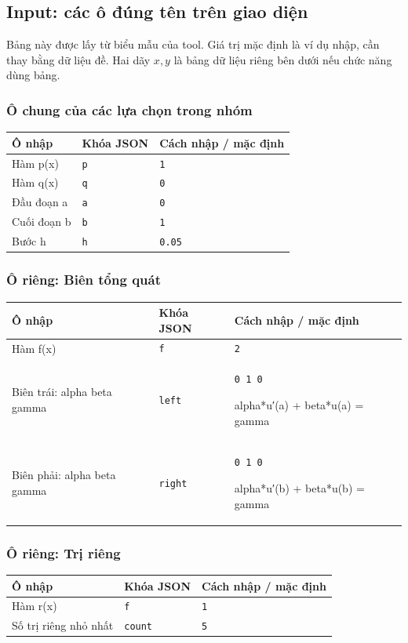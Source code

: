 \subsection*{Input: các ô đúng tên trên giao diện}
Bảng này được lấy từ biểu mẫu của tool. Giá trị mặc định là ví dụ nhập, cần thay bằng dữ liệu đề. Hai dãy $x,y$ là bảng dữ liệu riêng bên dưới nếu chức năng dùng bảng.
\subsubsection*{Ô chung của các lựa chọn trong nhóm}
\begin{center}\small\begin{tabular}{@{}p{.32\linewidth}p{.17\linewidth}p{.43\linewidth}@{}}\toprule
Ô nhập & Khóa JSON & Cách nhập / mặc định\\\midrule
Hàm p(x) & \texttt{p} & \texttt{1}\\[3pt]
Hàm q(x) & \texttt{q} & \texttt{0}\\[3pt]
Đầu đoạn a & \texttt{a} & \texttt{0}\\[3pt]
Cuối đoạn b & \texttt{b} & \texttt{1}\\[3pt]
Bước h & \texttt{h} & \texttt{0.05}\\[3pt]
\bottomrule\end{tabular}\end{center}
\subsubsection*{Ô riêng: Biên tổng quát}
\begin{center}\small\begin{tabular}{@{}p{.32\linewidth}p{.17\linewidth}p{.43\linewidth}@{}}\toprule
Ô nhập & Khóa JSON & Cách nhập / mặc định\\\midrule
Hàm f(x) & \texttt{f} & \texttt{2}\\[3pt]
Biên trái: alpha beta gamma & \texttt{left} & \texttt{0 1 0}
\par alpha*u′(a) + beta*u(a) = gamma\\[3pt]
Biên phải: alpha beta gamma & \texttt{right} & \texttt{0 1 0}
\par alpha*u′(b) + beta*u(b) = gamma\\[3pt]
\bottomrule\end{tabular}\end{center}
\subsubsection*{Ô riêng: Trị riêng}
\begin{center}\small\begin{tabular}{@{}p{.32\linewidth}p{.17\linewidth}p{.43\linewidth}@{}}\toprule
Ô nhập & Khóa JSON & Cách nhập / mặc định\\\midrule
Hàm r(x) & \texttt{f} & \texttt{1}\\[3pt]
Số trị riêng nhỏ nhất & \texttt{count} & \texttt{5}\\[3pt]
\bottomrule\end{tabular}\end{center}
